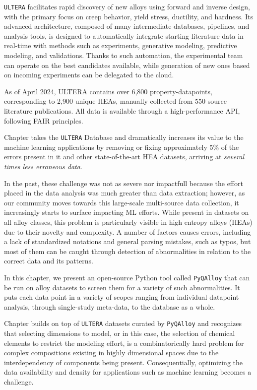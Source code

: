 \texttt{ULTERA} facilitates rapid discovery of new alloys using forward and inverse design, with the primary focus on creep behavior, yield stress, ductility, and hardness. Its advanced architecture, composed of many intermediate databases, pipelines, and analysis tools, is designed to automatically integrate starting literature data in real-time with methods such as experiments, generative modeling, predictive modeling, and validations. Thanks to such automation, the experimental team can operate on the best candidates available, while generation of new ones based on incoming experiments can be delegated to the cloud.

As of April 2024, ULTERA contains over 6,800 property-datapoints, corresponding to 2,900 unique HEAs, manually collected from 550 source literature publications. All data is available through a high-performance API, following FAIR principles.


Chapter  takes the \texttt{ULTERA} Database and dramatically increases its value to the machine learning applications by removing or fixing approximately 5\% of the errors present in it and other state-of-the-art HEA datasets, arriving at \emph{several times less erroneous data}.

In the past, these challenge was not as severe nor impactfull because the effort placed in the data analysis was much greater than data extraction; however, as our community moves towards this large-scale multi-source data collection, it increasingly starts to surface impacting ML efforts. While present in datasets on all alloy classes, this problem is particularly visible in high entropy alloys (HEAs) due to their novelty and complexity. A number of factors causes errors, including a lack of standardized notations and general parsing mistakes, such as typos, but most of them can be caught through detection of abnormalities in relation to the correct data and its patterns.

In this chapter, we present an open-source Python tool called \texttt{PyQAlloy} that can be run on alloy datasets to screen them for a variety of such abnormalities. It puts each data point in a variety of scopes ranging from individual datapoint analysis, through single-study meta-data, to the database as a whole.


Chapter  builds on top of \texttt{ULTERA} datasets curated by \texttt{PyQAlloy} and recognizes that selecting dimensions to model, or in this case, the selection of chemical elements to restrict the modeling effort, is a combinatorically hard problem for complex compositions existing in highly dimensional spaces due to the interdependency of components being present. Consequentially, optimizing the data availability and density for applications such as machine learning becomes a challenge.

